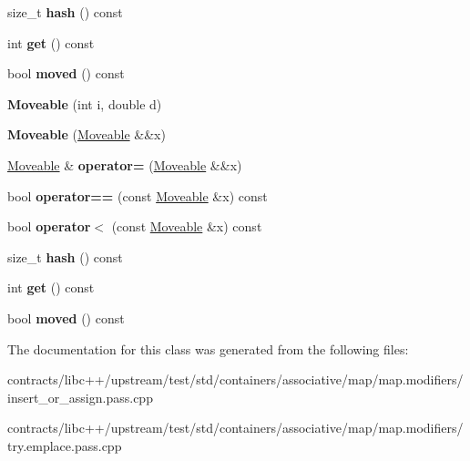 \begin{DoxyCompactItemize}
\mbox{\label{class_moveable_a2d746a1323108a0d132aca52b8a351f7}} 
size\+\_\+t {\bfseries hash} () const
\item 
\mbox{\label{class_moveable_a99435c0b3477247e039d148d4ade71ec}} 
int {\bfseries get} () const
\item 
\mbox{\label{class_moveable_a304d31368cde7d7d111477eef8453487}} 
bool {\bfseries moved} () const
\item 
\mbox{\label{class_moveable_abb9e849473ef67d2e62a5c310d60dee9}} 
{\bfseries Moveable} (int i, double d)
\item 
\mbox{\label{class_moveable_a8efd14a2649c1396e6461fbae17c36b1}} 
{\bfseries Moveable} (\mbox{\hyperlink{class_moveable}{Moveable}} \&\&x)
\item 
\mbox{\label{class_moveable_ab53585b17a1e20ec6c1a25a530634a92}} 
\mbox{\hyperlink{class_moveable}{Moveable}} \& {\bfseries operator=} (\mbox{\hyperlink{class_moveable}{Moveable}} \&\&x)
\item 
\mbox{\label{class_moveable_a913e4886aa94c7d876fab5be7dd44988}} 
bool {\bfseries operator==} (const \mbox{\hyperlink{class_moveable}{Moveable}} \&x) const
\item 
\mbox{\label{class_moveable_a7f5c349c4cef251010951bf012e67267}} 
bool {\bfseries operator$<$} (const \mbox{\hyperlink{class_moveable}{Moveable}} \&x) const
\item 
\mbox{\label{class_moveable_a2d746a1323108a0d132aca52b8a351f7}} 
size\+\_\+t {\bfseries hash} () const
\item 
\mbox{\label{class_moveable_a99435c0b3477247e039d148d4ade71ec}} 
int {\bfseries get} () const
\item 
\mbox{\label{class_moveable_a304d31368cde7d7d111477eef8453487}} 
bool {\bfseries moved} () const
\end{DoxyCompactItemize}


The documentation for this class was generated from the following files\+:\begin{DoxyCompactItemize}
\item 
contracts/libc++/upstream/test/std/containers/associative/map/map.\+modifiers/insert\+\_\+or\+\_\+assign.\+pass.\+cpp\item 
contracts/libc++/upstream/test/std/containers/associative/map/map.\+modifiers/try.\+emplace.\+pass.\+cpp\end{DoxyCompactItemize}
